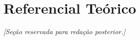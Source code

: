 \section{Referencial Te\'{o}rico}\label{sec:referencial}

\noindent\textit{[Se\c{c}\~{a}o reservada para reda\c{c}\~{a}o posterior.]}

